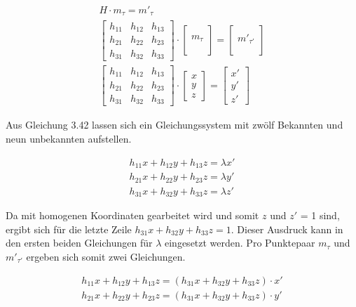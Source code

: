 \begin{gather}
	H\cdot m_\tau = m'_{\tau}\\
	\begin{bmatrix}
		h_{11}&h_{12}&h_{13}\\
		h_{21}&h_{22}&h_{23}\\
		h_{31}&h_{32}&h_{33}
	\end{bmatrix}
	\cdot
	\begin{bmatrix}
		\\m_\tau\\\\
	\end{bmatrix}
	=
	\begin{bmatrix}
		\\m'_{\tau'}\\\\
	\end{bmatrix}\\
	\begin{bmatrix}
		h_{11}&h_{12}&h_{13}\\
		h_{21}&h_{22}&h_{23}\\
		h_{31}&h_{32}&h_{33}
	\end{bmatrix}
	\cdot
	\begin{bmatrix}
		x\\y\\z
	\end{bmatrix}
	=
	\begin{bmatrix}
		x'\\y'\\z'
	\end{bmatrix}
\end{gather}

Aus Gleichung 3.42 lassen sich ein Gleichungssystem mit zwölf Bekannten und neun unbekannten aufstellen.  

\begin{gather}
	h_{11}x+h_{12}y+h_{13}z= \lambda x'\\
	h_{21}x+h_{22}y+h_{23}z= \lambda y'\\
	h_{31}x+h_{32}y+h_{33}z= \lambda z'
\end{gather}

Da mit homogenen Koordinaten gearbeitet wird und somit $z$ und $z'$ = 1 sind, ergibt sich für die letzte Zeile $h_{31}x+h_{32}y+h_{33}z= 1$. Dieser Ausdruck kann in den ersten beiden Gleichungen für $\lambda$ eingesetzt werden. Pro Punktepaar $m_\tau$ und $m'_{\tau'}$ ergeben sich somit zwei Gleichungen. 

\begin{gather}
	h_{11}x+h_{12}y+h_{13}z= (h_{31}x+h_{32}y+h_{33}z) \cdot x'\\
	h_{21}x+h_{22}y+h_{23}z= (h_{31}x+h_{32}y+h_{33}z) \cdot y'
\end{gather}

